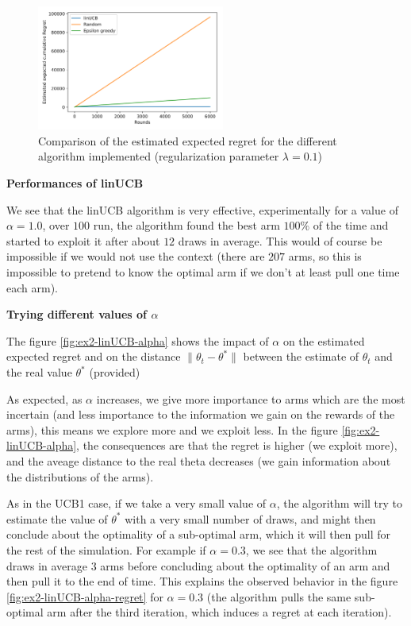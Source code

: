 \documentclass[a4paper, 11pt]{article}
\newcommand{\norm}[1]{\|#1\|}
\newcommand{\ipart}[1]{\vspace{0.5em}\textbf{#1}\vspace{0.5em}}
\begin{document}
\begin{figure}[h]
  \centering
  \includegraphics[width=0.55\textwidth]{ex2_comp_regret}
  \caption{Comparison of the estimated expected regret for the
    different algorithm implemented (regularization parameter $\lambda = 0.1$)}\label{fig:ex2-comp-regret}
\end{figure}

\ipart{Performances of linUCB}

We see that the linUCB algorithm is very effective, experimentally for
a value of $\alpha = 1.0$, over $100$ run, the algorithm found the
best arm $100\%$ of the time and started to exploit it after about
$12$ draws in average. This would of course be impossible if we would
not use the context (there are $207$ arms, so this is impossible to
pretend to know the optimal arm if we don't at least pull one time
each arm).

\newpage
\ipart{Trying different values of $\alpha$}

The figure \ref{fig:ex2-linUCB-alpha} shows the impact of $\alpha$ on
the estimated expected regret and on the distance
$\norm{\theta_t - \theta^*}$ between the estimate of $\theta_t$ and
the real value $\theta^*$ (provided)

As expected, as $\alpha$ increases, we give more importance to arms
which are the most incertain (and less importance to the information
we gain on the rewards of the arms), this means we explore more and
we exploit less. In the figure \ref{fig:ex2-linUCB-alpha}, the
consequences are that the regret is higher (we exploit more), and the
aveage distance to the real theta decreases (we gain information about
the distributions of the arms).

As in the UCB1 case, if we take a very small value of $\alpha$, the
algorithm will try to estimate the value of $\theta^*$ with a very
small number of draws, and might then conclude about the optimality of
a sub-optimal arm, which it will then pull for the rest of the
simulation. For example if $\alpha=0.3$, we see that the algorithm
draws in average $3$ arms before concluding about the optimality of an
arm and then pull it to the end of time. This explains the observed
behavior in the figure \ref{fig:ex2-linUCB-alpha-regret} for
$\alpha = 0.3$ (the algorithm pulls the same sub-optimal arm after the
third iteration, which induces a regret at each iteration).
\end{document}
